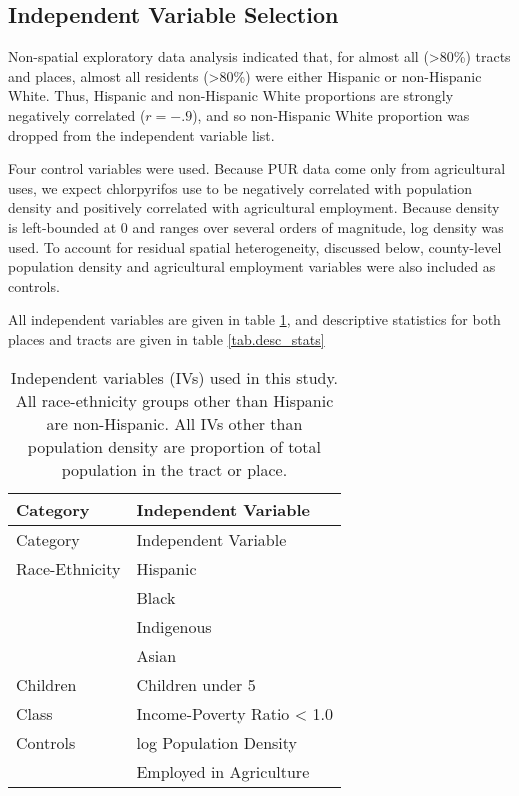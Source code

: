 \documentclass[ijerph,article,submit,oneauthor,pdftex]{Definitions/mdpi}
\begin{document}
\hypertarget{independent-variable-selection}{%
\subsection{Independent Variable Selection}\label{independent-variable-selection}}

\label{sec.iv_selection}

Non-spatial exploratory data analysis indicated that, for almost all (\textgreater80\%) tracts and places, almost all residents (\textgreater80\%) were either Hispanic or non-Hispanic White. Thus, Hispanic and non-Hispanic White proportions are strongly negatively correlated (\(r = -.9\)), and so non-Hispanic White proportion was dropped from the independent variable list.

Four control variables were used. Because PUR data come only from agricultural uses, we expect chlorpyrifos use to be negatively correlated with population density and positively correlated with agricultural employment. Because density is left-bounded at 0 and ranges over several orders of magnitude, log density was used. To account for residual spatial heterogeneity, discussed below, county-level population density and agricultural employment variables were also included as controls.

All independent variables are given in table \ref{tab.iv}, and descriptive statistics for both places and tracts are given in table \ref{tab.desc_stats}

\begin{longtable}[]{@{}ll@{}}
\caption{Independent variables (IVs) used in this study. All race-ethnicity groups other than Hispanic are non-Hispanic. All IVs other than population density are proportion of total population in the tract or place. \label{tab.iv}}\tabularnewline
\toprule
Category & Independent Variable\tabularnewline
\midrule
\endfirsthead
\toprule
Category & Independent Variable\tabularnewline
\midrule
\endhead
Race-Ethnicity & Hispanic\tabularnewline
& Black\tabularnewline
& Indigenous\tabularnewline
& Asian\tabularnewline
Children & Children under 5\tabularnewline
Class & Income-Poverty Ratio \textless{} 1.0\tabularnewline
Controls & log Population Density\tabularnewline
& Employed in Agriculture\tabularnewline
\bottomrule
\end{longtable}
\end{document}
